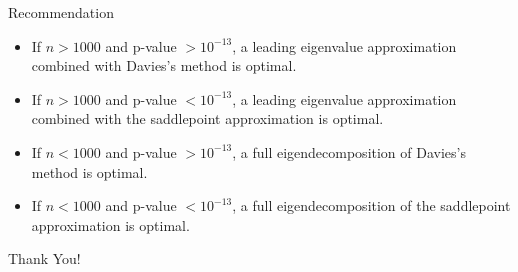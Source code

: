 \documentclass{beamer}
\begin{document}
\begin{frame}{Recommendation}
\begin{itemize}
    \item If $n > 1000$ and p-value $> 10^{-13}$, a leading eigenvalue approximation combined with Davies's method is optimal.
    \bigskip
    \item If $n > 1000$ and p-value $< 10^{-13}$, a leading eigenvalue approximation combined with the saddlepoint approximation is optimal.
    \bigskip
    \item If $n < 1000$ and p-value $> 10^{-13}$, a full eigendecomposition of Davies's method is optimal.
    \bigskip
    \item If $n < 1000$ and p-value $< 10^{-13}$, a full eigendecomposition of the saddlepoint approximation is optimal.
\end{itemize}
    \end{frame}
\begin{frame}[fragile]

\begin{center}
\Huge Thank You!
\end{center}


\end{frame}
\end{document}
